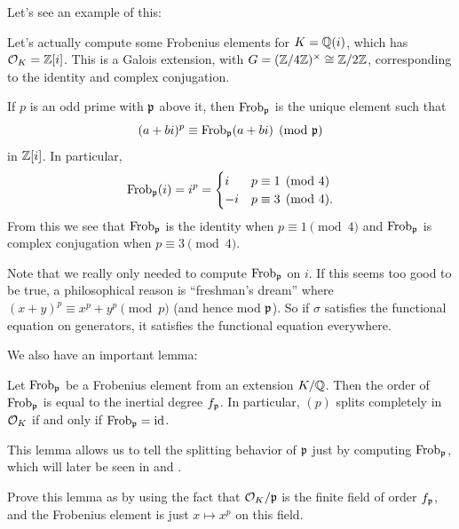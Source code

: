 Let's see an example of this:
\begin{example}
	\label{ex:frob_gaussian_integers}
	Let's actually compute some Frobenius elements for $K = \mathbb Q(i)$,
	which has $\mathcal O_K = \mathbb Z[i]$.
	This is a Galois extension, with $G = (\mathbb Z/4\mathbb Z)^\times \cong \mathbb Z/2\mathbb Z$,
	corresponding to the identity and complex conjugation.

	If $p$ is an odd prime with $\mathfrak p$ above it,
	then $\mathrm{Frob}_\mathfrak p$ is the unique element such that
	\[ (a+bi)^p \equiv \mathrm{Frob}_\mathfrak p(a+bi) \pmod{\mathfrak p} \]
	in $\mathbb Z[i]$. In particular,
	\[ \mathrm{Frob}_\mathfrak p(i) = i^p =
		\begin{cases}
			i & p \equiv 1 \pmod 4 \\
			-i & p \equiv 3 \pmod 4.
		\end{cases}
	\]
	From this we see that $\mathrm{Frob}_\mathfrak p$ is the identity when $p \equiv 1 \pmod 4$
	and $\mathrm{Frob}_\mathfrak p$ is complex conjugation when $p \equiv 3 \pmod 4$.
\end{example}
Note that we really only needed to compute $\mathrm{Frob}_\mathfrak p$ on $i$.
If this seems too good to be true,
a philosophical reason is ``freshman's dream''
where $(x+y)^p \equiv x^p + y^p \pmod{p}$ (and hence mod $\mathfrak p$).
So if $\sigma$ satisfies the functional equation on generators,
it satisfies the functional equation everywhere.

We also have an important lemma:
\begin{lemma}
	\label{lem:order_frob}
	Let $\mathrm{Frob}_\mathfrak p$ be a Frobenius element from an extension $K/\mathbb Q$.
	Then the order of $\mathrm{Frob}_\mathfrak p$ is equal to the inertial degree $f_\mathfrak p$.
	In particular, $(p)$ splits completely in $\mathcal O_K$
	if and only if $\mathrm{Frob}_\mathfrak p = \mathrm{id}$.
\end{lemma}
This lemma allows us to tell the splitting behavior of $\mathfrak p$ just by computing
$\mathrm{Frob}_\mathfrak p$, which will later be seen in  and
.
\begin{exercise}
	Prove this lemma as by using the fact that $\mathcal O_K / \mathfrak p$
	is the finite field of order $f_\mathfrak p$,
	and the Frobenius element is just $x \mapsto x^p$ on this field.
\end{exercise}

